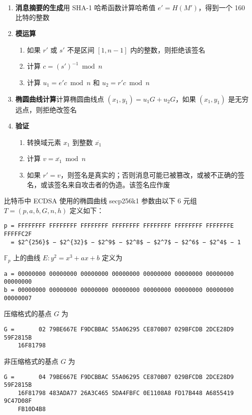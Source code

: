 \documentclass[a4paper,10pt]{article}
\begin{document}
\begin{enumerate}
  \item \textbf{消息摘要的生成}\quad 用 SHA-1 哈希函数计算哈希值 \(e'=H(M')\)，得到一个 160 比特的整数
  \item \textbf{模运算}
    \begin{enumerate}
      \item 如果 \(r'\) 或 \(s'\) 不是区间 \([1,n-1]\) 内的整数，则拒绝该签名
      \item 计算 \(c=(s')^{-1} \bmod n\)
      \item 计算 \(u_1=e'c\bmod n\) 和 \(u_2=r'c\bmod n\)
    \end{enumerate}
  \item \textbf{椭圆曲线计算}\quad 计算椭圆曲线点 \((x_1,y_1)=u_1G+u_2G\)，如果 \((x_1,y_1)\) 是无穷远点，则拒绝改签名
  \item \textbf{验证}
    \begin{enumerate}
      \item 转换域元素 \(x_1\) 到整数 \(\overline{x_1}\)
      \item 计算 \(v=\overline{x_1}\bmod n\)
      \item 如果 \(r'=v\)，则签名是真实的；否则消息可能已被篡改，或被不正确的签名，或该签名来自攻击者的伪造。该签名应作废
    \end{enumerate}
\end{enumerate}

比特币中 ECDSA 使用的椭圆曲线 secp256k1 参数由以下 6 元组 \(T=(p,a,b,G,n,h)\) 定义如下：
\begin{lstlisting}[mathescape]
p = FFFFFFFF FFFFFFFF FFFFFFFF FFFFFFFF FFFFFFFF FFFFFFFF FFFFFFFE FFFFFC2F
  = $2^{256}$ − $2^{32}$ − $2^9$ − $2^8$ − $2^7$ − $2^6$ − $2^4$ − 1  
\end{lstlisting}

\(\mathbb{F}_p\) 上的曲线 \(E: y^2 = x^3+ax+b\) 定义为
\begin{lstlisting}
a = 00000000 00000000 00000000 00000000 00000000 00000000 00000000 00000000
b = 00000000 00000000 00000000 00000000 00000000 00000000 00000000 00000007
\end{lstlisting}

压缩格式的基点 \(G\) 为 
\begin{lstlisting}
G =       02 79BE667E F9DCBBAC 55A06295 CE870B07 029BFCDB 2DCE28D9 59F2815B
    16F81798
\end{lstlisting}

非压缩格式的基点 \(G\) 为
\begin{lstlisting}
G =       04 79BE667E F9DCBBAC 55A06295 CE870B07 029BFCDB 2DCE28D9 59F2815B
    16F81798 483ADA77 26A3C465 5DA4FBFC 0E1108A8 FD17B448 A6855419 9C47D08F
    FB10D4B8
\end{lstlisting}
\end{document}
